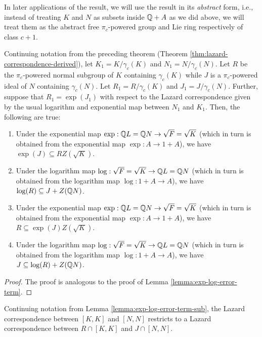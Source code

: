 In later applications of the result, we will use the result in its
{\em abstract} form, i.e., instead of treating $K$ and $N$ as subsets
inside $\mathbb{Q} + A$ as we did above, we will treat them as the abstract
free $\pi_c$-powered group and Lie ring respectively of class $c + 1$.

\begin{lemma}\label{lemma:exp-log-error-term-sub}
  Continuing notation from the preceding theorem (Theorem
  \ref{thm:lazard-correspondence-derived}), let $K_1 =
  K/\gamma_c(K)$ and $N_1 = N/\gamma_c(N)$. Let $R$ be the
  $\pi_c$-powered normal subgroup of $K$ containing $\gamma_c(K)$
  while $J$ is a $\pi_c$-powered ideal of $N$ containing
  $\gamma_c(N)$. Let $R_1 = R/\gamma_c(K)$ and $J_1 =
  J/\gamma_c(N)$. Further, suppose that $R_1 = \exp(J_1)$ with respect
  to the Lazard correspondence given by the usual logarithm and
  exponential map between $N_1$ and $K_1$. Then, the following are true:

  \begin{enumerate}
  \item Under the exponential map $\exp: \mathbb{Q} L = \mathbb{Q} N \to \sqrt{F} =
    \sqrt{K}$ (which in turn is obtained from the exponential map
    $\exp:A \to 1 + A$), we have $\exp(J) \subseteq
    RZ(\sqrt{K})$. 
  \item Under the logarithm map $\log: \sqrt{F} = \sqrt{K} \to \mathbb{Q} L =
    \mathbb{Q} N$ (which in turn is obtained from the logarithm map $\log:1 +
    A \to A$), we have $\log(R) \subseteq J + Z(\mathbb{Q} N)$.
  \item Under the exponential map $\exp: \mathbb{Q} L = \mathbb{Q} N \to \sqrt{F} =
    \sqrt{K}$ (which in turn is obtained from the exponential map
    $\exp:A \to 1 + A$), we have $R \subseteq
    \exp(J)Z(\sqrt{K})$. 
  \item Under the logarithm map $\log: \sqrt{F} = \sqrt{K} \to \mathbb{Q} L =
    \mathbb{Q} N$ (which in turn is obtained from the logarithm map $\log:1 +
    A \to A$), we have $J \subseteq \log(R) + Z(\mathbb{Q} N)$.

  \end{enumerate}
\end{lemma}

\begin{proof}
  The proof is analogous to the proof of Lemma
  \ref{lemma:exp-log-error-term}.
\end{proof}

\begin{theorem}\label{thm:lazard-correspondence-intersect-kernel}
  Continuing notation from Lemma \ref{lemma:exp-log-error-term-sub},
  the Lazard correspondence between $[K,K]$ and $[N,N]$ restricts to
  a Lazard correspondence between $R \cap [K,K]$ and $J \cap [N,N]$.
\end{theorem}

